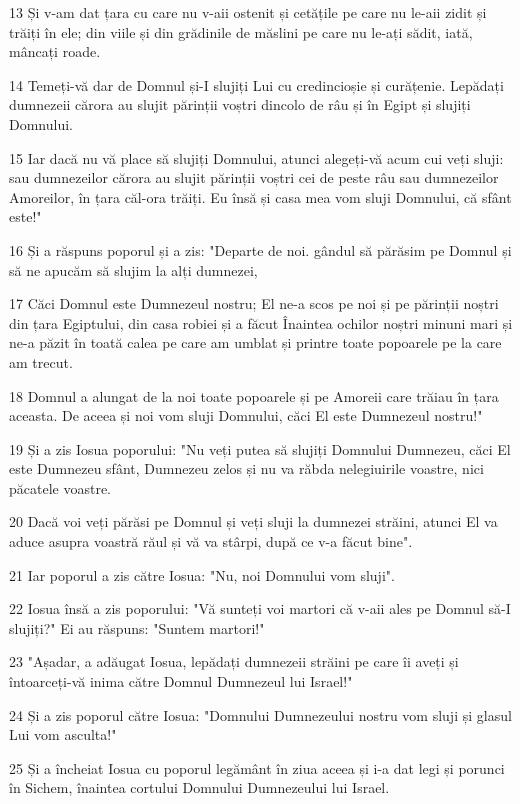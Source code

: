 \par 13 Și v-am dat țara cu care nu v-aii ostenit și cetățile pe care nu le-aii zidit și trăiți în ele; din viile și din grădinile de măslini pe care nu le-ați sădit, iată, mâncați roade.
\par 14 Temeți-vă dar de Domnul și-I slujiți Lui cu credincioșie și curățenie. Lepădați dumnezeii cărora au slujit părinții voștri dincolo de râu și în Egipt și slujiți Domnului.
\par 15 Iar dacă nu vă place să slujiți Domnului, atunci alegeți-vă acum cui veți sluji: sau dumnezeilor cărora au slujit părinții voștri cei de peste râu sau dumnezeilor Amoreilor, în țara căl-ora trăiți. Eu însă și casa mea vom sluji Domnului, că sfânt este!"
\par 16 Și a răspuns poporul și a zis: "Departe de noi. gândul să părăsim pe Domnul și să ne apucăm să slujim la alți dumnezei,
\par 17 Căci Domnul este Dumnezeul nostru; El ne-a scos pe noi și pe părinții noștri din țara Egiptului, din casa robiei și a făcut Înaintea ochilor noștri minuni mari și ne-a păzit în toată calea pe care am umblat și printre toate popoarele pe la care am trecut.
\par 18 Domnul a alungat de la noi toate popoarele și pe Amoreii care trăiau în țara aceasta. De aceea și noi vom sluji Domnului, căci El este Dumnezeul nostru!"
\par 19 Și a zis Iosua poporului: "Nu veți putea să slujiți Domnului Dumnezeu, căci El este Dumnezeu sfânt, Dumnezeu zelos și nu va răbda nelegiuirile voastre, nici păcatele voastre.
\par 20 Dacă voi veți părăsi pe Domnul și veți sluji la dumnezei străini, atunci El va aduce asupra voastră răul și vă va stârpi, după ce v-a făcut bine".
\par 21 Iar poporul a zis către Iosua: "Nu, noi Domnului vom sluji".
\par 22 Iosua însă a zis poporului: "Vă sunteți voi martori că v-aii ales pe Domnul să-I slujiți?" Ei au răspuns: "Suntem martori!"
\par 23 "Așadar, a adăugat Iosua, lepădați dumnezeii străini pe care îi aveți și întoarceți-vă inima către Domnul Dumnezeul lui Israel!"
\par 24 Și a zis poporul către Iosua: "Domnului Dumnezeului nostru vom sluji și glasul Lui vom asculta!"
\par 25 Și a încheiat Iosua cu poporul legământ în ziua aceea și i-a dat legi și porunci în Sichem, înaintea cortului Domnului Dumnezeului lui Israel.

